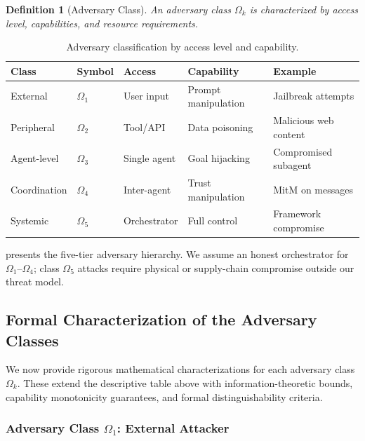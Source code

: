 \documentclass[
]{article}
\newtheorem{definition}{Definition}[section]
\begin{document}
\begin{definition}[Adversary Class]
\label{def:adversary-class}
An adversary class $\Omega_k$ is characterized by access level, capabilities, and resource requirements.
\end{definition}

\begin{table}[htbp]
\centering
\caption{Adversary classification by access level and capability.}
\label{tab:adversary-classes}
\begin{tabular}{@{}llllp{3cm}@{}}
\toprule
Class & Symbol & Access & Capability & Example \\
\midrule
External & $\Omega_1$ & User input & Prompt manipulation & Jailbreak attempts \\
Peripheral & $\Omega_2$ & Tool/API & Data poisoning & Malicious web content \\
Agent-level & $\Omega_3$ & Single agent & Goal hijacking & Compromised subagent \\
Coordination & $\Omega_4$ & Inter-agent & Trust manipulation & MitM on messages \\
Systemic & $\Omega_5$ & Orchestrator & Full control & Framework compromise \\
\bottomrule
\end{tabular}
\end{table}

 presents the five-tier adversary hierarchy.
We assume an honest orchestrator for \(\Omega_1\)--\(\Omega_4\); class
\(\Omega_5\) attacks require physical or supply-chain compromise outside
our threat model.

\subsection{Formal Characterization of the Adversary
Classes}\label{sec:adversary-formal}

We now provide rigorous mathematical characterizations for each
adversary class \(\Omega_k\). These extend the descriptive table above
with information-theoretic bounds, capability monotonicity guarantees,
and formal distinguishability criteria.

\subsubsection{\texorpdfstring{Adversary Class \(\Omega_1\): External
Attacker}{Adversary Class Omega_1: External Attacker}}\label{adversary-class-omega_1-external-attacker}
\end{document}

